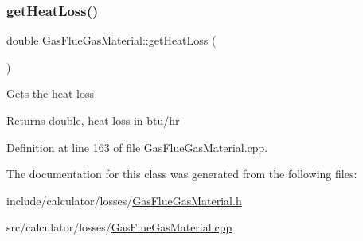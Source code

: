 \subsubsection{\texorpdfstring{get\+Heat\+Loss()}{getHeatLoss()}}
{\footnotesize\ttfamily double Gas\+Flue\+Gas\+Material\+::get\+Heat\+Loss (\begin{DoxyParamCaption}{ }\end{DoxyParamCaption})}

Gets the heat loss

\begin{DoxyReturn}{Returns}
double, heat loss in btu/hr 
\end{DoxyReturn}


Definition at line 163 of file Gas\+Flue\+Gas\+Material.\+cpp.



The documentation for this class was generated from the following files\+:\begin{DoxyCompactItemize}
\item 
include/calculator/losses/\hyperlink{_gas_flue_gas_material_8h}{Gas\+Flue\+Gas\+Material.\+h}\item 
src/calculator/losses/\hyperlink{_gas_flue_gas_material_8cpp}{Gas\+Flue\+Gas\+Material.\+cpp}\end{DoxyCompactItemize}
